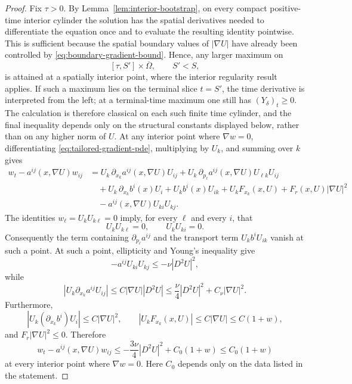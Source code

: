 \documentclass[11pt]{article}
\theoremstyle{remark}
\newcommand{\nupar}{\nu}
\begin{document}
\begin{proof}
Fix $\tau>0$. By Lemma~\ref{lem:interior-bootstrap}, on every compact
positive-time interior cylinder the solution has the spatial derivatives
needed to differentiate the equation once and to evaluate the resulting
identity pointwise. This is sufficient because the spatial boundary values
of $|\nabla U|$ have already been controlled by
\eqref{eq:boundary-gradient-bound}. Hence, any larger maximum on
\[
[\tau,S']\times\overline{\Omega},
\qquad S'<S,
\]
is attained at a spatially interior point, where the interior regularity
result applies. If such a maximum lies on the terminal slice $t=S'$, the
time derivative is interpreted from the left; at a terminal-time maximum
one still has $(Y_\delta)_t\geq0$. The calculation is therefore classical
on each such finite time cylinder, and the final inequality depends only
on the structural constants displayed below, rather than on any higher
norm of $U$. At any interior point where $\nabla w=0$, differentiating \eqref{eq:tailored-gradient-pde}, multiplying by $U_k$, and summing over $k$ gives
\[
\begin{aligned}
        w_t-a^{ij}(x,\nabla U)w_{ij}
        &=U_k\,\partial_{x_k}a^{ij}(x,\nabla U)U_{ij}
        +U_k\,\partial_{p_\ell}a^{ij}(x,\nabla U)U_{\ell k}U_{ij} \\
        &\quad+U_k\,\partial_{x_k}b^i(x)U_i
        +U_k b^i(x)U_{ik}
        +U_kF_{x_k}(x,U)+F_r(x,U)|\nabla U|^2 \\
        &\quad-a^{ij}(x,\nabla U)U_{ki}U_{kj}.
\end{aligned}
\]
The identities $w_\ell=U_kU_{k\ell}=0$ imply, for every $\ell$ and every $i$, that
\[
        U_kU_{k\ell}=0,
        \qquad
        U_kU_{ki}=0.
\]
Consequently the term containing $\partial_{p_\ell}a^{ij}$ and the transport term $U_kb^iU_{ik}$ vanish at such a point.  At such a point, ellipticity and Young's inequality give
\[
 -a^{ij}U_{ki}U_{kj}\le-\nupar|D^2U|^2,
\]
while
\[
 |U_k\partial_{x_k}a^{ij}U_{ij}|
 \le C|\nabla U||D^2U|
 \le \frac{\nupar}{4}|D^2U|^2+C_\nu|\nabla U|^2.
\]
Furthermore,
\[
 |U_k(\partial_{x_k}b^i)U_i|\le C|\nabla U|^2,
 \qquad
 |U_kF_{x_k}(x,U)|\le C|\nabla U|\le C(1+w),
\]
and $F_r|\nabla U|^2\le0$.  Therefore
\[
        w_t-a^{ij}(x,\nabla U)w_{ij}
        \le
        -\frac{3\nupar}{4}|D^2U|^2+C_0(1+w)
        \le C_0(1+w)
\]
at every interior point where $\nabla w=0$.  Here $C_0$ depends only on the data listed in the statement.


\end{proof}
\end{document}
